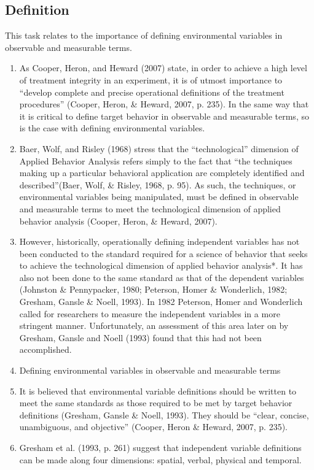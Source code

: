 \subsection{Definition}
This task relates to the importance of defining environmental variables in observable and measurable terms.
\begin{enumerate}
\item As Cooper, Heron, and Heward (2007) state, in order to achieve a high level of treatment integrity in an experiment, it is of utmost importance to ``develop complete and precise operational definitions of the treatment procedures'' (Cooper, Heron, \& Heward, 2007, p. 235). In the same way that it is critical to define target behavior in observable and measurable terms, so is the case with defining environmental variables. 
\item Baer, Wolf, and Risley (1968) stress that the ``technological'' dimension of Applied Behavior Analysis refers simply to the fact that ``the techniques making up a particular behavioral application are completely identified and described''(Baer, Wolf, \& Risley, 1968, p. 95). As such, the techniques, or environmental variables being manipulated, must be defined in observable and measurable terms to meet the technological dimension of applied behavior analysis (Cooper, Heron, \& Heward, 2007). 
\item However, historically, operationally defining independent variables has not been conducted to the standard required for a science of behavior that seeks to achieve the technological dimension of applied behavior analysis*. It has also not been done to the same standard as that of the dependent variables (Johnston \& Pennypacker, 1980; Peterson, Homer \& Wonderlich, 1982; Gresham, Gansle \& Noell, 1993). In 1982 Peterson, Homer and Wonderlich called for researchers to measure the independent variables in a more stringent manner. Unfortunately, an assessment of this area later on by Gresham, Gansle and Noell (1993) found that this had not been accomplished.
\item Defining environmental variables in observable and measurable terms
\item It is believed that environmental variable definitions should be written to meet the same standards as those required to be met by target behavior definitions (Gresham, Gansle \& Noell, 1993). They should be ``clear, concise, unambiguous, and objective'' (Cooper, Heron \& Heward, 2007, p. 235).
\item Gresham et al. (1993, p. 261) suggest that independent variable definitions can be made along four dimensions: spatial, verbal, physical and temporal. 
\end{enumerate}

